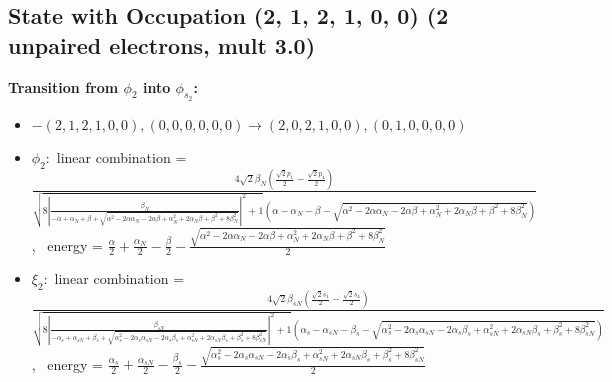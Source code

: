\documentclass[12pt,a4paper]{article}
\begin{document}
\subsection*{State with Occupation (2, 1, 2, 1, 0, 0) (2 unpaired electrons, mult 3.0)}
        \noindent\textbf{Transition from $\phi_{2}$ into $\phi_{s_{2}}$:}
        \begin{itemize}
            \item $- (2, 1, 2, 1, 0, 0), (0, 0, 0, 0, 0, 0) \rightarrow (2, 0, 2, 1, 0, 0), (0, 1, 0, 0, 0, 0)$
        
            \item $\phi_{2}:$ linear combination = $\frac{4 \sqrt{2} \beta_{N} \left(\frac{\sqrt{2} p_{1}}{2} - \frac{\sqrt{2} p_{4}}{2}\right)}{\sqrt{8 \left|{\frac{\beta_{N}}{- \alpha + \alpha_{N} + \beta + \sqrt{\alpha^{2} - 2 \alpha \alpha_{N} - 2 \alpha \beta + \alpha_{N}^{2} + 2 \alpha_{N} \beta + \beta^{2} + 8 \beta_{N}^{2}}}}\right|^{2} + 1} \left(\alpha - \alpha_{N} - \beta - \sqrt{\alpha^{2} - 2 \alpha \alpha_{N} - 2 \alpha \beta + \alpha_{N}^{2} + 2 \alpha_{N} \beta + \beta^{2} + 8 \beta_{N}^{2}}\right)}$, \
            energy = $\frac{\alpha}{2} + \frac{\alpha_{N}}{2} - \frac{\beta}{2} - \frac{\sqrt{\alpha^{2} - 2 \alpha \alpha_{N} - 2 \alpha \beta + \alpha_{N}^{2} + 2 \alpha_{N} \beta + \beta^{2} + 8 \beta_{N}^{2}}}{2}$
            
            \item $\xi_{2}:$ linear combination = $\frac{4 \sqrt{2} \beta_{s N} \left(\frac{\sqrt{2} s_{1}}{2} - \frac{\sqrt{2} s_{4}}{2}\right)}{\sqrt{8 \left|{\frac{\beta_{s N}}{- \alpha_{s} + \alpha_{s N} + \beta_{s} + \sqrt{\alpha_{s}^{2} - 2 \alpha_{s} \alpha_{s N} - 2 \alpha_{s} \beta_{s} + \alpha_{s N}^{2} + 2 \alpha_{s N} \beta_{s} + \beta_{s}^{2} + 8 \beta_{s N}^{2}}}}\right|^{2} + 1} \left(\alpha_{s} - \alpha_{s N} - \beta_{s} - \sqrt{\alpha_{s}^{2} - 2 \alpha_{s} \alpha_{s N} - 2 \alpha_{s} \beta_{s} + \alpha_{s N}^{2} + 2 \alpha_{s N} \beta_{s} + \beta_{s}^{2} + 8 \beta_{s N}^{2}}\right)}$, \
            energy = $\frac{\alpha_{s}}{2} + \frac{\alpha_{s N}}{2} - \frac{\beta_{s}}{2} - \frac{\sqrt{\alpha_{s}^{2} - 2 \alpha_{s} \alpha_{s N} - 2 \alpha_{s} \beta_{s} + \alpha_{s N}^{2} + 2 \alpha_{s N} \beta_{s} + \beta_{s}^{2} + 8 \beta_{s N}^{2}}}{2}$
            

\end{itemize}
\end{document}
